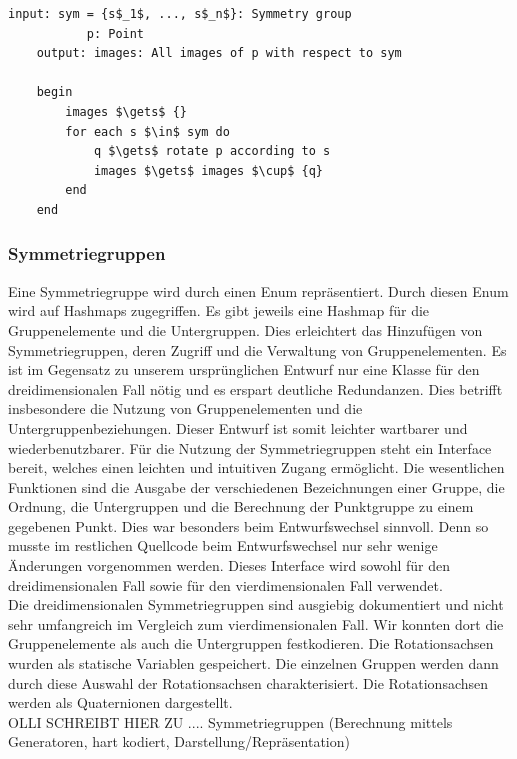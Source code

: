         \begin{lstlisting}[mathescape, morekeywords={for, each, do, begin,input, output, end, return}, caption={Peusdocode der Bildmengenberechnung}, label=alg:images]
    input: sym = {s$_1$, ..., s$_n$}: Symmetry group
           p: Point
    output: images: All images of p with respect to sym
    
    begin
        images $\gets$ {}
        for each s $\in$ sym do
            q $\gets$ rotate p according to s
            images $\gets$ images $\cup$ {q}
        end
    end
        \end{lstlisting}
    \subsubsection{Symmetriegruppen}
    Eine Symmetriegruppe wird durch einen Enum repräsentiert. Durch diesen Enum wird auf Hashmaps zugegriffen. Es gibt jeweils eine Hashmap für die Gruppenelemente und die Untergruppen. Dies erleichtert das Hinzufügen von Symmetriegruppen, deren Zugriff und die Verwaltung von Gruppenelementen. Es ist im Gegensatz zu unserem ursprünglichen Entwurf nur eine Klasse für den dreidimensionalen Fall nötig und es erspart deutliche Redundanzen. Dies betrifft insbesondere die Nutzung von Gruppenelementen und die Untergruppenbeziehungen. Dieser Entwurf ist somit leichter wartbarer und wiederbenutzbarer.
    Für die Nutzung der Symmetriegruppen steht ein Interface bereit, welches einen leichten und intuitiven Zugang ermöglicht. Die wesentlichen Funktionen sind die Ausgabe der verschiedenen Bezeichnungen einer Gruppe, die Ordnung, die Untergruppen und die Berechnung der Punktgruppe zu einem gegebenen Punkt. Dies war besonders beim Entwurfswechsel sinnvoll. Denn so musste im restlichen Quellcode beim Entwurfswechsel nur sehr wenige Änderungen vorgenommen werden. Dieses Interface wird sowohl für den dreidimensionalen Fall sowie für den vierdimensionalen Fall verwendet.\\ 
    Die dreidimensionalen Symmetriegruppen sind ausgiebig dokumentiert und nicht sehr umfangreich im Vergleich zum vierdimensionalen Fall. Wir konnten dort die Gruppenelemente als auch die Untergruppen festkodieren. Die Rotationsachsen wurden als statische Variablen gespeichert. Die einzelnen Gruppen werden dann durch diese Auswahl der Rotationsachsen charakterisiert. Die Rotationsachsen werden als Quaternionen dargestellt.  \\
        OLLI SCHREIBT HIER ZU .... Symmetriegruppen (Berechnung mittels Generatoren, hart kodiert, Darstellung/Repräsentation)
